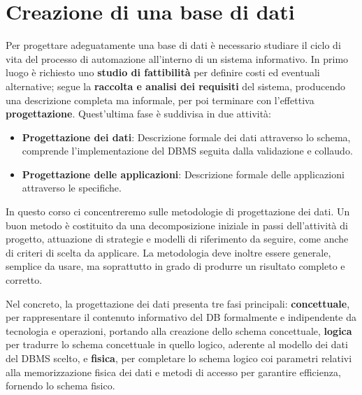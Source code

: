 %

\section{Creazione di una base di dati}
Per progettare adeguatamente una base di dati è necessario studiare il ciclo di vita del processo di automazione all'interno di un sistema informativo.
In primo luogo è richiesto uno \textbf{studio di fattibilità} per definire costi ed eventuali alternative; segue la \textbf{raccolta e analisi dei 
requisiti} del sistema, producendo una descrizione completa ma informale, per poi terminare con l'effettiva \textbf{progettazione}. Quest'ultima fase è
suddivisa in due attività: \begin{itemize}
    \item \textbf{Progettazione dei dati}: Descrizione formale dei dati attraverso lo schema, comprende l'implementazione del DBMS seguita dalla
	validazione e collaudo.
    \item \textbf{Progettazione delle applicazioni}: Descrizione formale delle applicazioni attraverso le specifiche.
\end{itemize}

\noindent In questo corso ci concentreremo sulle metodologie di progettazione dei dati. Un buon metodo è costituito da una decomposizione iniziale in
passi dell'attività di progetto, attuazione di strategie e modelli di riferimento da seguire, come anche di criteri di scelta da applicare. La
metodologia deve inoltre essere generale, semplice da usare, ma soprattutto in grado di produrre un risultato completo e corretto.\par
Nel concreto, la progettazione dei dati presenta tre fasi principali: \textbf{concettuale}, per rappresentare il contenuto informativo del DB
formalmente e indipendente da tecnologia e operazioni, portando alla creazione dello schema concettuale, \textbf{logica} per tradurre lo schema
concettuale in quello logico, aderente al modello dei dati del DBMS scelto, e \textbf{fisica}, per completare lo schema logico coi parametri relativi
alla memorizzazione fisica dei dati e metodi di accesso per garantire efficienza, fornendo lo schema fisico.

%

